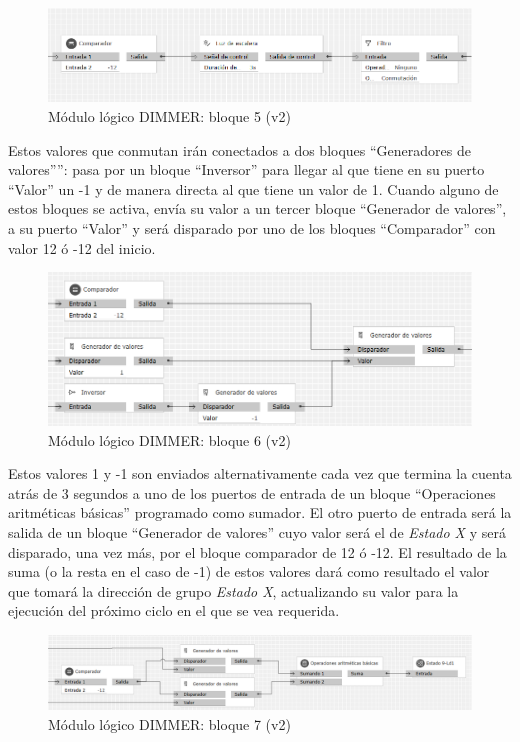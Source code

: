 \begin{figure}[H]
\includegraphics[width=1.15\textwidth]{figures/log_dimm_b25.png}  
\caption{Módulo lógico DIMMER: bloque 5 (v2)}
\label{fig:log_dimm_b25}
\end{figure}

Estos valores que conmutan irán conectados a dos bloques “Generadores de valores””: pasa por un bloque “Inversor” para llegar al que tiene en su puerto “Valor” un -1 y de manera directa al que tiene un valor de 1. Cuando alguno de estos bloques se activa, envía su valor a un tercer bloque “Generador de valores”, a su puerto “Valor” y será disparado por uno de los bloques “Comparador” con valor 12 ó -12 del inicio.

\begin{figure}[H]
\includegraphics[width=1.15\textwidth]{figures/log_dimm_b26.png}  
\caption{Módulo lógico DIMMER: bloque 6 (v2)}
\label{fig:log_dimm_b26}
\end{figure}

Estos valores 1 y -1 son enviados alternativamente cada vez que termina la cuenta atrás de 3 segundos a uno de los puertos de entrada de un bloque “Operaciones aritméticas básicas” programado como sumador. El otro puerto de entrada será la salida de un bloque “Generador de valores” cuyo valor será el de \textit{Estado X} y será disparado, una vez más, por el bloque comparador de 12 ó -12. El resultado de la suma (o la resta en el caso de -1) de estos valores dará como resultado el valor que tomará la dirección de grupo \textit{Estado X}, actualizando su valor para la ejecución del próximo ciclo en el que se vea requerida.

\begin{figure}[H]
\includegraphics[width=1.15\textwidth]{figures/log_dimm_b27.png}  
\caption{Módulo lógico DIMMER: bloque 7 (v2)}
\label{fig:log_dimm_b27}
\end{figure}


